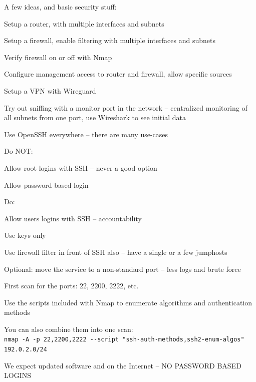 \documentclass[Screen16to9,17pt]{foils}
\begin{document}
A few ideas, and basic security stuff:
\begin{list2}
\item Setup a router, with multiple interfaces and subnets
\item Setup a firewall, enable filtering with multiple interfaces and subnets
\item Verify firewall on or off with Nmap
\item Configure management access to router and firewall, allow specific sources
\item Setup a VPN with Wireguard
\item Try out sniffing with a monitor port in the network -- centralized monitoring of all subnets from one port, use Wireshark to see initial data
\end{list2}




Use OpenSSH everywhere -- there are many use-cases

Do NOT:
\begin{list2}
\item Allow root logins with SSH -- never a good option
\item Allow password based login
\end{list2}

Do:
\begin{list2}
\item Allow users logins with SSH -- accountability
\item Use keys only
\item Use firewall filter in front of SSH also -- have a single or a few jumphosts
\item Optional: move the service to a non-standard port -- less logs and brute force
\end{list2}



\begin{list2}
\item First scan for the ports: 22, 2200, 2222, etc.
\item Use the scripts included with Nmap to enumerate algorithms and authentication methods
\item You can also combine them into one scan:\\
\verb+nmap -A -p 22,2200,2222 --script "ssh-auth-methods,ssh2-enum-algos" 192.0.2.0/24+
\item We expect updated software and on the Internet -- NO PASSWORD BASED LOGINS
\end{list2}
\end{document}
